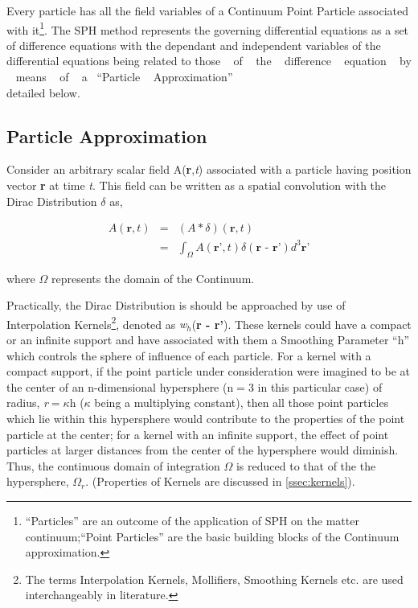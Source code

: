 Every particle has all the field variables of a Continuum Point Particle associated with it\footnote{``Particles'' are an outcome of the application of SPH on the matter continuum;``Point Particles'' are the basic building blocks of the Continuum approximation.}. The SPH method represents the governing differential equations as a set of difference equations with the dependant and independent variables of the differential equations being related to those ~ of ~ the ~ difference ~ equation ~ by ~ means ~ of ~ a ~``Particle ~ Approximation'' ~ \cite{sph:volieu}\\\cite{liu_liu} detailed below.

\subsection{Particle Approximation}\label{kappa}

Consider an arbitrary scalar field A(\textbf{r},\textit{t}) associated with a particle having position vector \textbf{r} at time \textit{t}. This field can be written as a spatial convolution with the Dirac Distribution $\delta$ as, 

\begin{eqnarray} \label{eq:dirac}
 A(\textbf{r},\textit{t}) &=& (A\ast \delta)(\textbf{r},t) \nonumber \\
                          &=& \int_{\varOmega} A(\textbf{r'},t) \delta (\textbf{r - r'}) d^{3}\textbf{r'} 
\end{eqnarray}

where $\varOmega$ represents the domain of the Continuum. 

Practically, the Dirac Distribution is should be approached by use of Interpolation Kernels\footnote{The terms Interpolation Kernels, Mollifiers, Smoothing Kernels etc. are used interchangeably in literature.}, denoted as \textit{w$_h$}(\textbf{r - r'}). These kernels could have a compact or an infinite support and have associated with them a Smoothing Parameter ``h'' which controls the sphere of influence of each particle. For a kernel with a compact support, if the point particle under consideration were imagined to be at the center of an n-dimensional hypersphere (n$=$3 in this particular case) of radius, \textit{r}$=\kappa$h ($\kappa$ being a multiplying constant), then all those point particles which lie within this hypersphere would contribute to the properties of the point particle at the center; for a kernel with an infinite support, the effect of point particles at larger distances from the center of the hypersphere would diminish. Thus, the continuous domain of integration $\varOmega$ is reduced to that of the the hypersphere, $\varOmega_r$. (Properties of Kernels are discussed in \ref{ssec:kernels}). 

